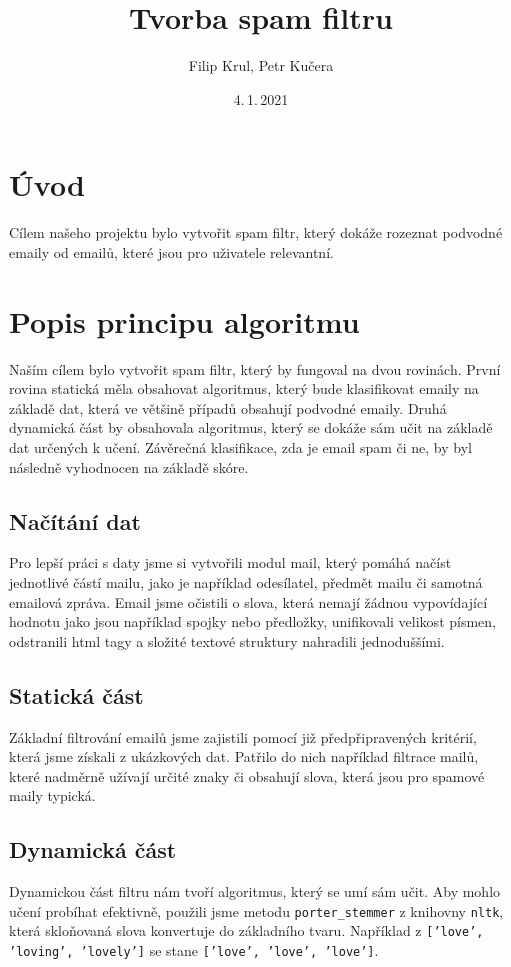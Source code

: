 \documentclass[12pt]{article}
\title{Tvorba spam filtru}
\author{Filip Krul, Petr Kučera}
\date{4.\,1.\,2021}
\begin{document}
\section{Úvod}\label{kapitola}

Cílem našeho projektu bylo vytvořit spam filtr, který dokáže rozeznat podvodné emaily od emailů, které jsou pro uživatele relevantní.

\section{Popis principu algoritmu}

Naším cílem bylo vytvořit spam filtr, který by fungoval na dvou rovinách. První rovina statická měla obsahovat algoritmus, který bude klasifikovat emaily na základě dat, která ve většině případů obsahují podvodné emaily. Druhá dynamická část by obsahovala algoritmus, který se dokáže sám učit na základě dat určených k učení. Závěrečná klasifikace, zda je email spam či ne, by byl následně vyhodnocen na základě skóre.

\subsection{Načítání dat}

Pro lepší práci s daty jsme si vytvořili modul mail, který pomáhá načíst jednotlivé částí mailu, jako je například odesílatel, předmět mailu či samotná emailová zpráva. Email jsme očistili o slova, která nemají žádnou vypovídající hodnotu jako jsou například spojky nebo předložky, unifikovali velikost písmen, odstranili html tagy a složité textové struktury nahradili jednoduššími.

\subsection{Statická část}

Základní filtrování emailů jsme zajistili pomocí již předpřipravených kritérií, která jsme získali z ukázkových dat. Patřilo do nich například filtrace mailů, které nadměrně užívají určité znaky či obsahují slova, která jsou pro spamové maily typická.

\subsection{Dynamická část}

Dynamickou část filtru nám tvoří algoritmus, který se umí sám učit. Aby mohlo učení probíhat efektivně, použili jsme metodu \texttt{porter\_stemmer} z knihovny \texttt{nltk}, která skloňovaná slova konvertuje do základního tvaru. Například z \texttt{['love', 'loving', 'lovely']} se stane \texttt{['love', 'love', 'love']}.
\end{document}
